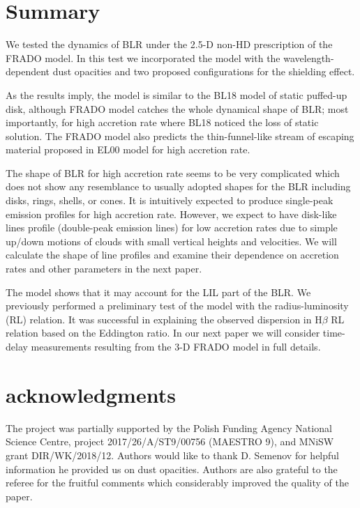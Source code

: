 \documentclass[twocolumn]{aastex62}
\begin{document}
\section{Summary}

We tested the dynamics of BLR under the 2.5-D non-HD prescription of the FRADO model.
In this test we incorporated the model with the wavelength-dependent dust opacities and two proposed configurations for the shielding effect.

As the results imply, the model is similar to the BL18 model of static puffed-up disk, although FRADO model catches the whole dynamical shape of BLR; most importantly, for high accretion rate where BL18 noticed the loss of static solution. The FRADO model also predicts the thin-funnel-like stream of escaping material proposed in EL00 model for high accretion rate.

The shape of BLR for high accretion rate seems to be very complicated which does not show any resemblance to usually adopted shapes for the BLR including disks, rings, shells, or cones. It is intuitively expected to produce single-peak emission profiles for high accretion rate. However, we expect to have disk-like lines profile (double-peak emission lines) for low accretion rates due to simple up/down motions of clouds with small vertical heights and velocities. We will calculate the shape of line profiles and examine their dependence on accretion rates and other parameters in the next paper.

The model shows that it may account for the LIL part of the BLR. We previously performed a preliminary test of the model with the radius-luminosity (RL) relation. It was successful in explaining the observed dispersion in H$\beta$ RL relation based on the Eddington ratio. In our next paper we will consider time-delay measurements resulting from the 3-D FRADO model in full details.


\acknowledgments
\section*{acknowledgments}

The project was partially supported by the Polish Funding Agency National Science Centre, project 2017/26/A/ST9/00756 (MAESTRO 9), and MNiSW grant DIR/WK/2018/12.
Authors would like to thank D. Semenov for helpful information he provided us on dust opacities. Authors are also grateful to the referee for the fruitful comments which considerably improved the quality of the paper.
\end{document}
